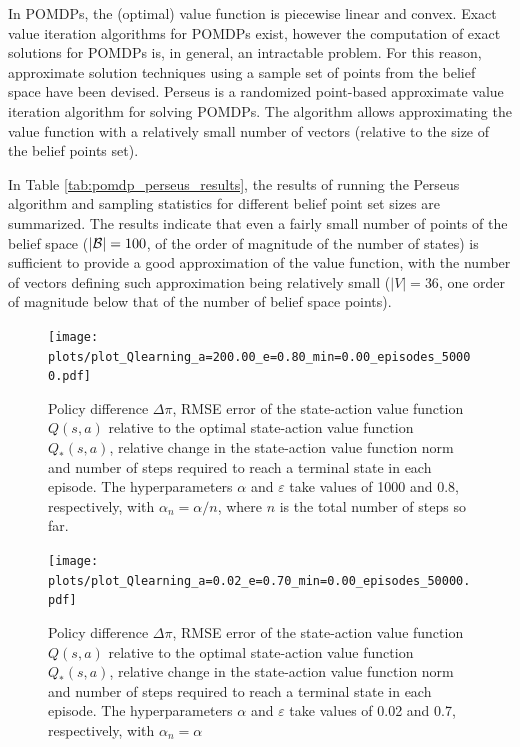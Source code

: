 \documentclass[a4paper]{article}
\begin{document}
In POMDPs, the (optimal) value function is piecewise linear and convex. Exact value iteration algorithms for POMDPs exist, however the computation of exact solutions for POMDPs is, in general, an intractable problem. For this reason, approximate solution techniques using a sample set of points from the belief space have been devised. Perseus is a randomized point-based approximate value iteration algorithm for solving POMDPs. The algorithm allows approximating the value function with a relatively small number of vectors (relative to the size of the belief points set).

In Table \ref{tab:pomdp_perseus_results}, the results of running the Perseus algorithm and sampling statistics for different belief point set sizes are summarized. The results indicate that even a fairly small number of points of the belief space ($| {\cal B} |=100$, of the order of magnitude of the number of states) is sufficient to provide a good approximation of the value function, with the number of vectors defining such approximation being relatively small ($| V |=36$, one order of magnitude below that of the number of belief space points).

\begin{figure}[htbp]
\centering
\texttt{[image: plots/plot\_Qlearning\_a=200.00\_e=0.80\_min=0.00\_episodes\_50000.pdf]}
\caption{Policy difference $\Delta \pi$, RMSE error of the state-action value function $Q(s,a)$ relative to the optimal state-action value function $Q_{*}(s,a)$, relative change in the state-action value function norm and number of steps required to reach a terminal state in each episode. The hyperparameters $\alpha$ and $\varepsilon$ take values of 1000 and 0.8, respectively, with $\alpha_n = \alpha / n$, where $n$ is the total number of steps so far.}
\label{fig:q_learning_convergence_ensured}
\end{figure}

\begin{figure}[htbp]
\centering
\texttt{[image: plots/plot\_Qlearning\_a=0.02\_e=0.70\_min=0.00\_episodes\_50000.pdf]}
\caption{Policy difference $\Delta \pi$, RMSE error of the state-action value function $Q(s,a)$ relative to the optimal state-action value function $Q_{*}(s,a)$, relative change in the state-action value function norm and number of steps required to reach a terminal state in each episode. The hyperparameters $\alpha$ and $\varepsilon$ take values of 0.02 and 0.7, respectively, with $\alpha_n = \alpha$}
\label{fig:q_learning_convergence_not_ensured}
\end{figure}
\end{document}
